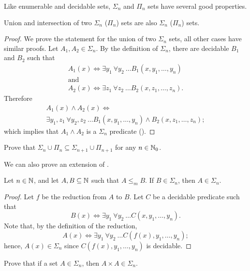 Like enumerable and decidable sets, $\Sigma_n$ and $\Pi_n$ sets have several
good properties.
\begin{theorem}
  Union and intersection of two $\Sigma_n$ ($\Pi_n$) sets are also $\Sigma_n$
  ($\Pi_n$) sets.
\end{theorem}
\begin{proof}
  We prove the statement for the union of two $\Sigma_n$ sets, all other cases
  have similar proofs. Let $A_1, A_2 \in \Sigma_n$. By the definition of
  $\Sigma_n$, there are decidable $B_1$ and $B_2$ such that 
  \begin{gather*}
    A_1(x) \iff \exists y_1 \  \forall y_2 \  \dots B_1(x, y_1, \dots, y_n) \\
    \text{and} \\
    A_2(x) \iff \exists z_1 \  \forall z_2 \  \dots B_2(x, z_1, \dots, z_n).
  \end{gather*}
  Therefore 
  \begin{multline*}
      A_1(x) \land A_2(x) \iff \\
      \exists y_1, z_1 \  \forall y_2, z_2 \  \dots 
        B_1(x, y_1, \dots, y_n) \land B_2(x, z_1, \dots, z_n);
  \end{multline*}
  which implies that $A_1 \land A_2$ is a $\Sigma_n$ predicate
  ().
\end{proof}

\begin{exercise}
  Prove that $\Sigma_n \cup \Pi_n \subseteq \Sigma_{n + 1} \cup \Pi_{n + 1}$ for
  any $n \in {\mathbb{N}}_0$.
\end{exercise}

We can also prove an extension of
.
\begin{theorem}
  Let $n \in {\mathbb{N}}$, and let $A, B \subseteq {\mathbb{N}}$ such that $A \le_m B$.
  If $B \in \Sigma_n$, then $A \in \Sigma_n$.
\end{theorem}
\begin{proof}
  Let $f$ be the reduction from $A$ to $B$. Let $C$ be a decidable predicate
  such that
  \[
    B(x) \iff \exists y_1 \  \forall y_2 \  \dots C(x, y_1, \dots, y_n).
  \]
  Note that, by the definition of the reduction, 
  \[
    A(x) \iff \exists y_1 \  \forall y_2 \  \dots C(f(x), y_1, \dots, y_n);
  \]
  hence, $A(x) \in \Sigma_n$ since $C(f(x), y_1, \dots, y_n)$ is decidable.
\end{proof}


\begin{exercise}
  Prove that if a set $A \in \Sigma_n$, then $A \times A \in \Sigma_n$.
\end{exercise}

